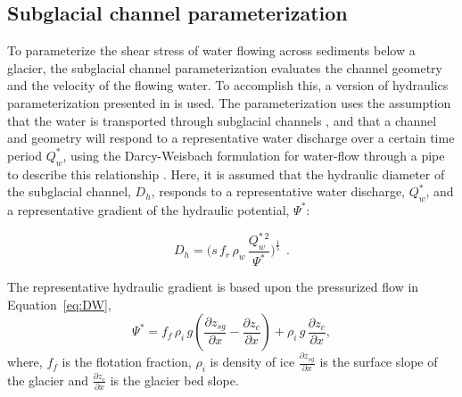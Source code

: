 \documentclass[11pt]{article}
\begin{document}
\begin{spacing}{1}
          \subsection{Subglacial channel  parameterization}
          \label{sect:sub_mode}
          To parameterize the shear stress of water flowing across sediments below a glacier, the subglacial channel parameterization evaluates the channel geometry and the velocity of the flowing water. 
          To accomplish this, a version of hydraulics parameterization presented in \citet{delaney2019} is used.
          The parameterization uses the assumption that the water is transported through subglacial channels \citep[Figure~\ref{fig:cartoon}; ][]{rothlisberger1972}, and that a channel and geometry will respond to a representative water discharge over a certain time period $Q_{w}^*$, using the Darcy-Weisbach formulation for water-flow through a pipe to describe this relationship \citep[e.g.][]{rothlisberger1972,clarke2003,werder2013}.
          Here, it is assumed that the hydraulic diameter of the subglacial channel, $D_h$, responds to a representative water discharge, $Q_{w}^*$, and a representative gradient of the hydraulic potential, $\Psi^*$:
          \begin{linenomath*}
            \begin{equation}
              \label{eq:DW}
              D_h = \big(s\, f_r\,\rho_w\, \frac{Q_w^{*\,2}}{\Psi^*}\big)^{\frac{1}{5}}~~.
            \end{equation}
          \end{linenomath*}
          The representative hydraulic gradient is based upon the pressurized flow in Equation~\ref{eq:DW},
          \begin{equation}
            \label{eq:psi}
            \Psi^*= f_f \,  \rho_i \, g (\frac{\partial  z_{sg}}{\partial x} - \frac{\partial z_c}{\partial x}) +  \rho_i \, g \, \frac{\partial z_c}{\partial x},
          \end{equation}
          \noindent
          where, $f_f$ is the flotation fraction, $\rho_i$ is density of ice $\frac{\partial z_{sg}}{\partial x}$ is the surface slope of the glacier and $\frac{\partial z_c}{\partial x}$ is the glacier bed slope.
          

\end{spacing}
\end{document}
